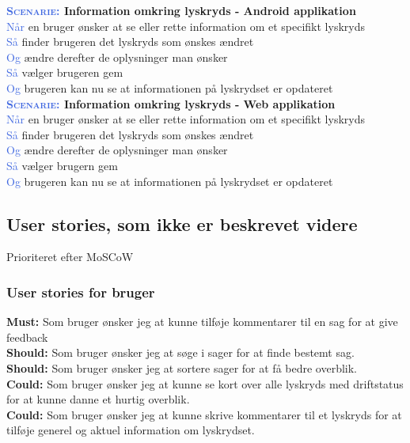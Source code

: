 \textbf{\textsc{\textcolor{RoyalBlue}{Scenarie:}} Information omkring lyskryds - Android applikation}\\
\textcolor{RoyalBlue}{Når} en bruger ønsker at se eller rette information om et specifikt lyskryds\\
\textcolor{RoyalBlue}{Så} finder brugeren det lyskryds som ønskes ændret\\
\textcolor{RoyalBlue}{Og} ændre derefter de oplysninger man ønsker\\
\textcolor{RoyalBlue}{Så} vælger brugeren gem\\
\textcolor{RoyalBlue}{Og} brugeren kan nu se at informationen på lyskrydset er opdateret\\

\textbf{\textsc{\textcolor{RoyalBlue}{Scenarie:}} Information omkring lyskryds - Web applikation}\\
\textcolor{RoyalBlue}{Når} en bruger ønsker at se eller rette information om et specifikt lyskryds\\
\textcolor{RoyalBlue}{Så} finder brugeren det lyskryds som ønskes ændret\\
\textcolor{RoyalBlue}{Og} ændre derefter de oplysninger man ønsker\\
\textcolor{RoyalBlue}{Så} vælger brugern gem\\
\textcolor{RoyalBlue}{Og} brugeren kan nu se at informationen på lyskrydset 
er opdateret\\


\subsection{User stories, som ikke er beskrevet videre}
Prioriteret efter MoSCoW

\subsubsection{User stories for bruger}
\textbf{Must:} Som bruger ønsker jeg at kunne tilføje kommentarer til en sag for at give feedback\\
\textbf{Should:} Som bruger ønsker jeg at søge i sager for at finde bestemt sag.\\
\textbf{Should:} Som bruger ønsker jeg at sortere sager for at få bedre overblik.\\
\textbf{Could:}  Som bruger ønsker jeg at kunne se kort over alle lyskryds med driftstatus for at kunne danne et hurtig overblik.\\
\textbf{Could:} Som bruger ønsker jeg at kunne skrive kommentarer til et lyskryds for at tilføje generel og aktuel information om lyskrydset.

